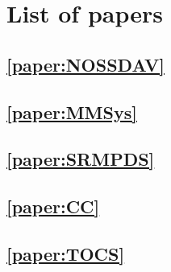 \chapter{List of papers}

\section*{\cref{paper:NOSSDAV}}


\section*{\cref{paper:MMSys}}


\section*{\cref{paper:SRMPDS}}


\section*{\cref{paper:CC}}


\section*{\cref{paper:TOCS}}

